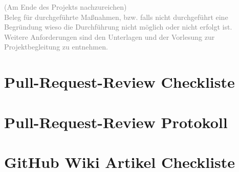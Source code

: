 \documentclass[accentcolor=tud0b,12pt,paper=a4]{tudreport}
\begin{document}
		\textcolor{gray}{(Am Ende des Projekts nachzureichen)}\\
		
		\textcolor{gray}{Beleg für durchgeführte Maßnahmen, bzw. falls nicht durchgeführt eine Begründung wieso die Durchführung nicht möglich oder nicht erfolgt ist. \\
		Weitere Anforderungen sind den Unterlagen und der Vorlesung zur Projektbegleitung zu entnehmen.}
	
	\section{Pull-Request-Review Checkliste}
	
	\section{Pull-Request-Review Protokoll}
	
	\section{GitHub Wiki Artikel Checkliste}
	
\end{document}
